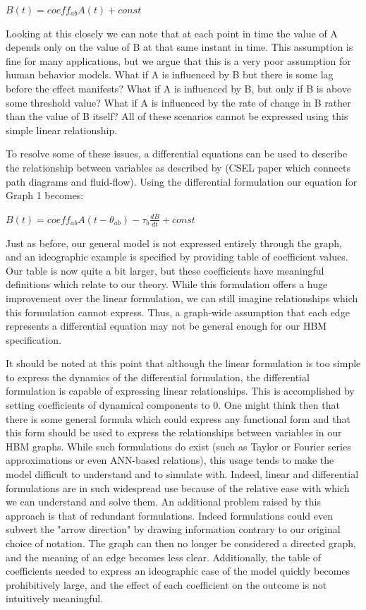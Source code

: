 \documentclass[conference]{IEEEtran}
\begin{document}
$B(t) = coeff_{ab}A(t) + const$

Looking at this closely we can note that at each point in time the value of A depends only on the value of B at that same instant in time.
This assumption is fine for many applications, but we argue that this is a very poor assumption for human behavior models. What if A is influenced by B but there is some lag before the effect manifests?
What if A is influenced by B, but only if B is above some threshold value? What if A is influenced by the rate of change in B rather than the value of B itself? All of these scenarios cannot be expressed using this simple linear relationship. 

To resolve some of these issues, a differential equations can be used to describe the relationship between variables as described by (CSEL paper which connects path diagrams and fluid-flow). Using the differential formulation our equation for Graph 1 becomes:

$B(t) = coeff_{ab}A(t-\theta_{ab}) - \tau_{b}\frac{dB}{dt} + const$

Just as before, our general model is not expressed entirely through the graph, and an ideographic example is specified by providing table of coefficient values.
Our table is now quite a bit larger, but these coefficients have meaningful definitions which relate to our theory.
While this formulation offers a huge improvement over the linear formulation, we can still imagine relationships which this formulation cannot express.
Thus, a graph-wide assumption that each edge represents a differential equation may not be general enough for our HBM specification. 

It should be noted at this point that although the linear formulation is too simple to express the dynamics of the differential formulation, the differential formulation is capable of expressing linear relationships.
This is accomplished by setting coefficients of dynamical components to 0.
One might think then that there is some general formula which could express any functional form and that this form should be used to express the relationships between variables in our HBM graphs.
While such formulations do exist (such as Taylor or Fourier series approximations or even ANN-based relations), this usage tends to make the model difficult to understand and to simulate with.
Indeed, linear and differential formulations are in such widespread use because of the relative ease with which we can understand and solve them. An additional problem raised by this approach is that of redundant formulations.
Indeed formulations could even subvert the "arrow direction" by drawing information contrary to our original choice of notation.
The graph can then no longer be considered a directed graph, and the meaning of an edge becomes less clear.
Additionally, the table of coefficients needed to express an ideographic case of the model quickly becomes prohibitively large, and the effect of each coefficient on the outcome is not intuitively meaningful.
\end{document}
